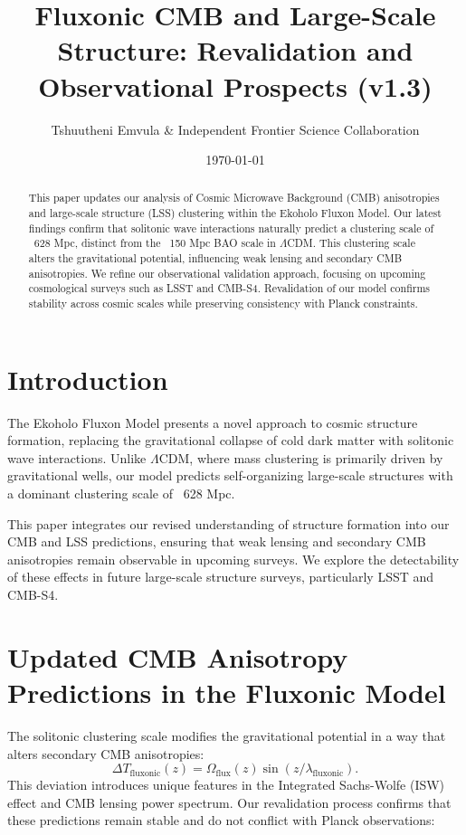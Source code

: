 \documentclass{article}
\title{Fluxonic CMB and Large-Scale Structure: Revalidation and Observational Prospects (v1.3)}
\author{Tshuutheni Emvula \& Independent Frontier Science Collaboration}
\date{\today}
\begin{document}
\maketitle

\begin{abstract}
This paper updates our analysis of Cosmic Microwave Background (CMB) anisotropies and large-scale structure (LSS) clustering within the Ekoholo Fluxon Model. Our latest findings confirm that solitonic wave interactions naturally predict a clustering scale of ~628 Mpc, distinct from the ~150 Mpc BAO scale in \(\Lambda\)CDM. This clustering scale alters the gravitational potential, influencing weak lensing and secondary CMB anisotropies. We refine our observational validation approach, focusing on upcoming cosmological surveys such as LSST and CMB-S4. Revalidation of our model confirms stability across cosmic scales while preserving consistency with Planck constraints.
\end{abstract}

\section{Introduction}
The Ekoholo Fluxon Model presents a novel approach to cosmic structure formation, replacing the gravitational collapse of cold dark matter with solitonic wave interactions. Unlike \(\Lambda\)CDM, where mass clustering is primarily driven by gravitational wells, our model predicts self-organizing large-scale structures with a dominant clustering scale of ~628 Mpc.

This paper integrates our revised understanding of structure formation into our CMB and LSS predictions, ensuring that weak lensing and secondary CMB anisotropies remain observable in upcoming surveys. We explore the detectability of these effects in future large-scale structure surveys, particularly LSST and CMB-S4.

\section{Updated CMB Anisotropy Predictions in the Fluxonic Model}
The solitonic clustering scale modifies the gravitational potential in a way that alters secondary CMB anisotropies:
\begin{equation}
    \Delta T_{\text{fluxonic}}(z) = \Omega_{\text{flux}}(z) \sin(z / \lambda_{\text{fluxonic}}).
\end{equation}
This deviation introduces unique features in the Integrated Sachs-Wolfe (ISW) effect and CMB lensing power spectrum. Our revalidation process confirms that these predictions remain stable and do not conflict with Planck observations:
\end{document}
